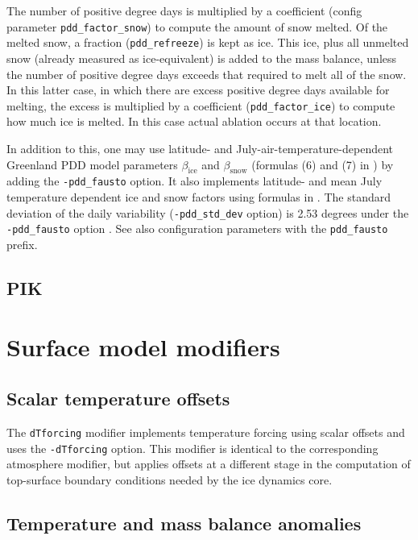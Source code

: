 \documentclass[titlepage,letterpaper,final]{scrartcl}
\newcommand{\intextoption}[1]{\texttt{-#1}\optindex{\texttt{-#1}}}
\begin{document}
The number of positive degree days is multiplied by a coefficient (config
parameter \texttt{pdd_factor_snow}) to compute the amount of snow melted. Of
the melted snow, a fraction (\texttt{pdd_refreeze}) is kept as ice. This ice,
plus all unmelted snow (already measured as ice-equivalent) is added to the
mass balance, unless the number of positive degree days exceeds that required
to melt all of the snow. In this latter case, in which there are excess
positive degree days available for melting, the excess is multiplied by a
coefficient (\texttt{pdd_factor_ice}) to compute how much ice is melted. In
this case actual ablation occurs at that location.

In addition to this, one may use latitude- and July-air-temperature-dependent
Greenland PDD model parameters $\beta_{\mathrm{ice}}$ and
$\beta_{\mathrm{snow}}$ (formulas (6) and (7) in \cite{Faustoetal2009}) by
adding the \intextoption{pdd_fausto} option. It also implements latitude- and
mean July temperature dependent ice and snow factors using formulas in
\cite{Faustoetal2009}. The standard deviation of the daily variability
(\intextoption{pdd_std_dev} option) is 2.53 degrees under the
\intextoption{pdd_fausto} option \cite{Faustoetal2009}. See also configuration
parameters with the \texttt{pdd_fausto} prefix.

\subsection{PIK}
\label{sec:surface-pik}


\section{Surface model modifiers}
\label{sec:modifiers}

\subsection{Scalar temperature offsets}
\label{sec:surface-delta-temp}

The \texttt{dTforcing} modifier implements temperature forcing using scalar
offsets and uses the \texttt{-dTforcing} option. This modifier is identical to
the corresponding atmosphere modifier, but applies offsets at a different stage
in the computation of top-surface boundary conditions needed by the ice
dynamics core.

\subsection{Temperature and mass balance anomalies}
\label{sec:temp-smb-anomalies}
\end{document}
